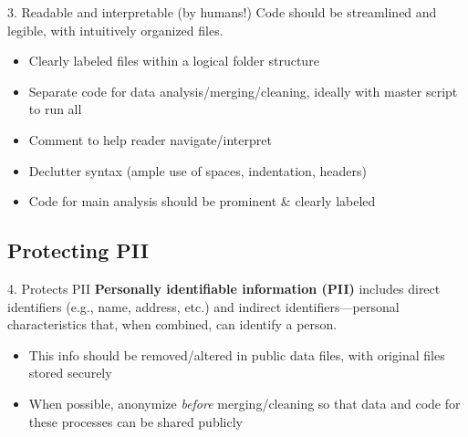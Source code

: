 \documentclass[12pt, compress]{beamer} %
\let\olditem\item %
\renewcommand{\item}{%
\olditem\vspace{\fill}}
\begin{document}
	\begin{frame}{3. Readable and interpretable (by humans!)}
		Code should be streamlined and legible, with intuitively organized files. 
		
		\pause
		\begin{itemize}		
			\item Clearly labeled files within a logical folder structure
			\item Separate code for data analysis/merging/cleaning, ideally with master script to run all
			\item Comment to help reader navigate/interpret
			\item Declutter syntax (ample use of spaces, indentation, headers)
			\item Code for main analysis should be prominent \& clearly labeled
		\end{itemize} 
			
	\end{frame}

\subsection{Protecting PII}
 
	\begin{frame}{4. Protects PII}
		 \textbf{Personally identifiable information (PII)} includes \textcolor{burntorange}{direct identifiers} (e.g., name, address, etc.) and \textcolor{burntorange}{indirect identifiers}---personal characteristics that, when combined, can identify a person.
			 
		\pause	 
		\begin{itemize}		
			\item This info should be removed/altered in public data files, with original files stored securely
			\item When possible, anonymize \textit{before} merging/cleaning so that data and code for these processes can be shared publicly
		\end{itemize} 
		\bigskip
			
	\end{frame}
 
\end{document}
